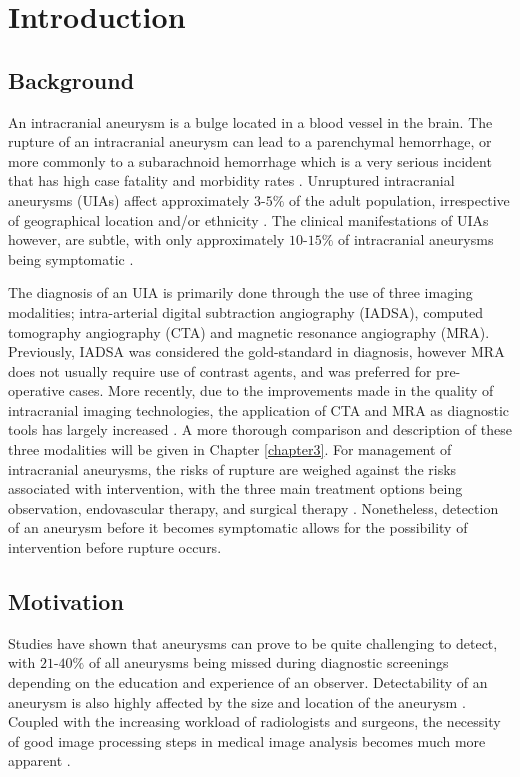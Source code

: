 \chapter{Introduction}
\label{chapter1}

\section{Background}
An intracranial aneurysm is a bulge located in a blood vessel in the brain. The rupture of an intracranial aneurysm can lead to a parenchymal hemorrhage, or more commonly to a subarachnoid hemorrhage which is a very serious incident that has high case fatality and morbidity rates \cite{Keedy2006}. Unruptured intracranial aneurysms (UIAs) affect approximately $3$-$5 \%$ of the adult population, irrespective of geographical location and/or ethnicity \cite{vlak2011prevalence}. The clinical manifestations of UIAs however, are subtle, with only approximately $10$-$15\%$ of intracranial aneurysms being symptomatic \cite{friedman2001small}. 

The diagnosis of an UIA is primarily done through the use of three imaging modalities; intra-arterial digital subtraction angiography (IADSA), computed tomography angiography (CTA) and magnetic resonance angiography (MRA). Previously, IADSA was considered the gold-standard in diagnosis, however MRA does not usually require use of contrast agents, and was preferred for pre-operative cases. More recently, due to the improvements made in the quality of intracranial imaging technologies, the application of CTA and MRA as diagnostic tools has largely increased \cite{Brown2014}. A more thorough comparison and description of these three modalities will be given in Chapter \ref{chapter3}. For management of intracranial aneurysms, the risks of rupture are weighed against the risks associated with intervention, with the three main treatment options being observation, endovascular therapy, and surgical therapy \cite{Keedy2006}. Nonetheless, detection of an aneurysm before it becomes symptomatic allows for the possibility of intervention before rupture occurs.

\section{Motivation}
Studies have shown that aneurysms can prove to be quite challenging to detect, with $21$-$40\%$ of all aneurysms being missed during diagnostic screenings depending on the education and experience of an observer. Detectability of an aneurysm is also highly affected by the size and location of the aneurysm \cite{okahara2002diagnostic}. Coupled with the increasing workload of radiologists and surgeons, the necessity of good image processing steps in medical image analysis becomes much more apparent .

